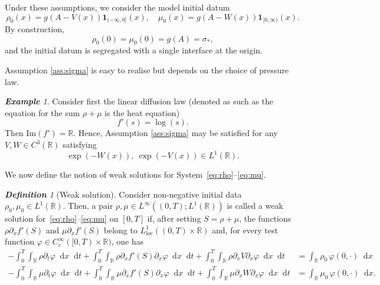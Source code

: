 \documentclass[a4paper,twosided, 11pt]{article}
\newcommand{\R}{\mathbb{R}}
\theoremstyle{plain}
\theoremstyle{remark}
\newtheorem{definition}[thm]{\bf Definition}
\newtheorem{example}[thm]{\bf Example}
\newcommand{\one}{\mathbf{1}}
\newcommand{\diff}{\mathop{} \mathrm{d}}
\numberwithin{equation}{section}
\begin{document}
Under these assumptions, we consider the model initial datum
\begin{equation}
\label{eq:initial-data}
\rho_0(x)=g\left(A-V(x)\right)\one_{(-\infty,0]}(x), \quad
\mu_0(x)=g\left(A-W(x)\right)\one_{[0,\infty)}(x).
\end{equation}
By construction,
\[
\rho_0(0)=\mu_0(0)=g(A)=\sigma_*,
\]
and the initial datum is segregated with a single interface at the origin.


\medskip 

Assumption \ref{ass:sigma} is easy to realise but depends on the choice of pressure law. 
\begin{example}\label{example:profile}
Consider first the linear diffusion law (denoted as such as the equation for the sum $\rho+\mu$ is the heat equation)
\[
f'(s) = \log(s).
\]
Then $\mathrm{Im}(f') = \R$. 
Hence, Assumption \ref{ass:sigma} may be satisfied for any $V,W\in C^3(\R)$ satisfying 
\[
\exp(-W(x)), \ \exp(-V(x)) \in L^1(\R).
\]
\end{example}

We now define the notion of weak solutions for System~\eqref{eq:rho}--\eqref{eq:mu}.

\begin{definition}[Weak solution]
\label{def:weak}
Consider non-negative initial data $\rho_0,\mu_0 \in L^1(\R)$.
Then, a pair $\rho,\mu\in L^\infty((0,T);L^1(\R))$
is called a weak solution for~\eqref{eq:rho}--\eqref{eq:mu} on $[0,T]$ if, after setting $S=\rho+\mu$, the functions $\rho\partial_x f'(S)$ and $\mu\partial_x f'(S)$ belong to $L^1_{\mathrm{loc}}((0,T)\times\R)$ and, for every test function $\varphi\in C_c^{\infty}([0,T)\times\R)$, one has
\begin{align*}
-\int_0^T \int_{\R}\rho \partial_t\varphi\diff  x\diff  t+ \int_0^T \int_{\R}\rho \partial_x f'(S) \partial_x\varphi\diff  x\diff  t
+\int_0^T \int_{\R}\rho \partial_x V \partial_x\varphi\diff  x\diff  t
&=\int_{\R}\rho_{0}\,\varphi(0,\cdot)\diff x 
\\
-\int_0^T \int_{\R}\mu \partial_t\varphi\diff  x\diff  t+\int_0^T \int_{\R}\mu \partial_x f'(S) \partial_x\varphi\diff  x\diff  t
+\int_0^T \int_{\R}\mu \partial_x W \partial_x\varphi\diff  x\diff  t
&=\int_{\R}\mu_{0}\,\varphi(0,\cdot)\diff x.
\end{align*}
\end{definition}
\end{document}
